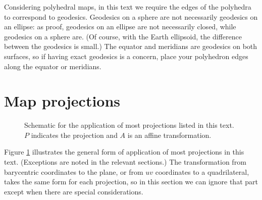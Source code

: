 \documentclass{amsart}[12pt]
\begin{document}
Considering polyhedral maps, in this text we require the edges of the polyhedra
to correspond to geodesics. Geodesics on a sphere are not necessarily geodesics
on an ellipse: as proof, geodesics on an ellipse are not necessarily closed,
while geodesics on a sphere are. (Of course, with the Earth ellipsoid, the
difference between the geodesics is small.) The equator and meridians are
geodesics on both surfaces, so if having exact geodesics is a concern,
place your polyhedron edges along the equator or meridians.

\section{Map projections}

\begin{figure}%
\caption{Schematic for the application of most projections listed in this text.
$P$ indicates the projection and $A$ is an affine transformation.}
\label{fig:schematic}
\end{figure}

Figure \ref{fig:schematic} illustrates the general form of application of most
projections in this text. (Exceptions are noted in the relevant sections.) The
transformation from barycentric coordinates to the plane, or from $uv$
coordinates to a quadrilateral, takes the same form for each projection, so in
this section we can ignore that part except when there are special
considerations.
\end{document}
